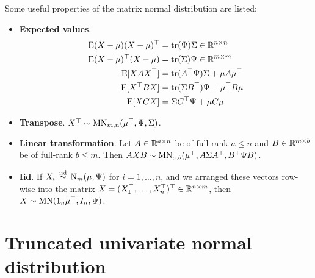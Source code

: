 Some useful properties of the matrix normal distribution are listed:
\begin{itemize}
  \item \textbf{Expected values}.
  \begin{align*}
    \operatorname{E} (X-\mu)(X-\mu)^\top &= \operatorname{tr}(\Psi)\Sigma \in \mathbb{R}^{n\times n} \\
    \operatorname{E} (X-\mu)^\top(X-\mu) &= \operatorname{tr}(\Sigma)\Psi \in \mathbb{R}^{m\times m} \\
    \operatorname{E} [XAX^\top] &= \operatorname{tr}(A^\top\Psi)\Sigma + \mu A\mu^\top \\
    \operatorname{E} [X^\top BX] &= \operatorname{tr}(\Sigma B^\top)\Psi + \mu^\top B\mu \\   
    \operatorname{E} [X CX] &=  \Sigma C^\top\Psi  + \mu C \mu \\    
  \end{align*} 
  \item \textbf{Transpose}. $X^\top \sim \operatorname{MN}_{m,n}(\mu^\top, \Psi, \Sigma)$.
  \item \textbf{Linear transformation}. Let $A \in \mathbb{R}^{a \times n}$ be of full-rank $a \leq n$ and $B \in \mathbb{R}^{m \times b}$ be of full-rank $b\leq m$. Then $AXB  \sim \operatorname{MN}_{a,b}(\mu^\top, A\Sigma A^\top, B^\top \Psi B)$.
  \item \textbf{Iid}. If $X_i \,\overset{\text{iid}}{\sim}\, \operatorname{N}_m(\mu,\Psi)$ for $i=1,\dots,n$, and we arranged these vectors row-wise into the matrix $X = (X_1^\top,\dots,X_n^\top)^\top \in \mathbb{R}^{n\times m}$, then $X \sim \operatorname{MN}(1_n \mu^\top, I_n, \Psi)$.
\end{itemize}

\section{Truncated univariate normal distribution}
\label{apx:truncuninorm}

